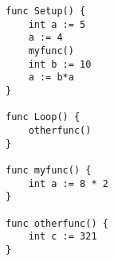 \begin{lstlisting}[caption={Program structure similar to Arduino but where loop is optional}]
func Setup() {
	int a := 5
	a := 4
	myfunc()
	int b := 10
	a := b*a
}

func Loop() {
	otherfunc()
}

func myfunc() {
	int a := 8 * 2
}

func otherfunc() {
	int c := 321
}
\end{lstlisting}